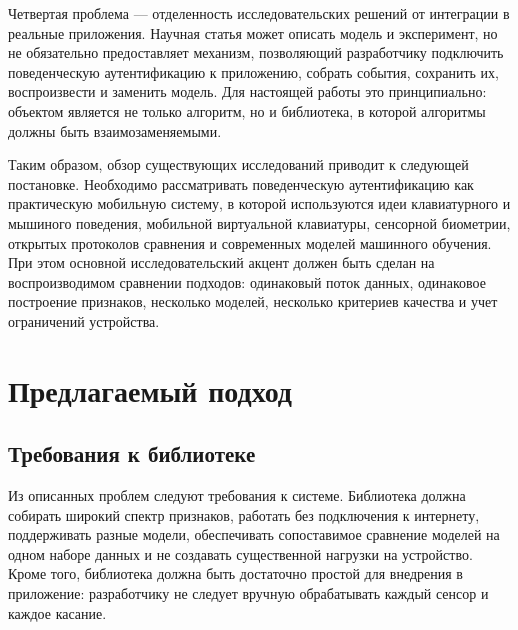 \documentclass[oneside,senior,etd]{BYUPhys}
\begin{document}
Четвертая проблема --- отделенность исследовательских решений от интеграции в реальные приложения. Научная статья может описать модель и эксперимент, но не обязательно предоставляет механизм, позволяющий разработчику подключить поведенческую аутентификацию к приложению, собрать события, сохранить их, воспроизвести и заменить модель. Для настоящей работы это принципиально: объектом является не только алгоритм, но и библиотека, в которой алгоритмы должны быть взаимозаменяемыми.

Таким образом, обзор существующих исследований приводит к следующей постановке. Необходимо рассматривать поведенческую аутентификацию как практическую мобильную систему, в которой используются идеи клавиатурного и мышиного поведения, мобильной виртуальной клавиатуры, сенсорной биометрии, открытых протоколов сравнения и современных моделей машинного обучения. При этом основной исследовательский акцент должен быть сделан на воспроизводимом сравнении подходов: одинаковый поток данных, одинаковое построение признаков, несколько моделей, несколько критериев качества и учет ограничений устройства.


\section{Предлагаемый подход}

\subsection{Требования к библиотеке}

Из описанных проблем следуют требования к системе. Библиотека должна собирать широкий спектр признаков, работать без подключения к интернету, поддерживать разные модели, обеспечивать сопоставимое сравнение моделей на одном наборе данных и не создавать существенной нагрузки на устройство. Кроме того, библиотека должна быть достаточно простой для внедрения в приложение: разработчику не следует вручную обрабатывать каждый сенсор и каждое касание.
\end{document}
